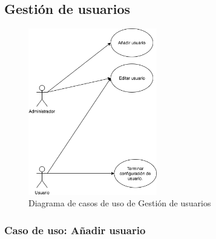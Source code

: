 \documentclass[12pt,a4paperpaper,]{report}
\begin{document}
\subsection{Gestión de usuarios}\label{gestiuxf3n-de-usuarios}

\begin{figure}
\centering
\includegraphics[width=0.50000\textwidth]{source/figures/gestion-usuarios.png}
\caption{Diagrama de casos de uso de Gestión de usuarios
\label{gestion_usuarios}}
\end{figure}

\subsubsection{Caso de uso: Añadir
usuario}\label{caso-de-uso-auxf1adir-usuario}
\end{document}
